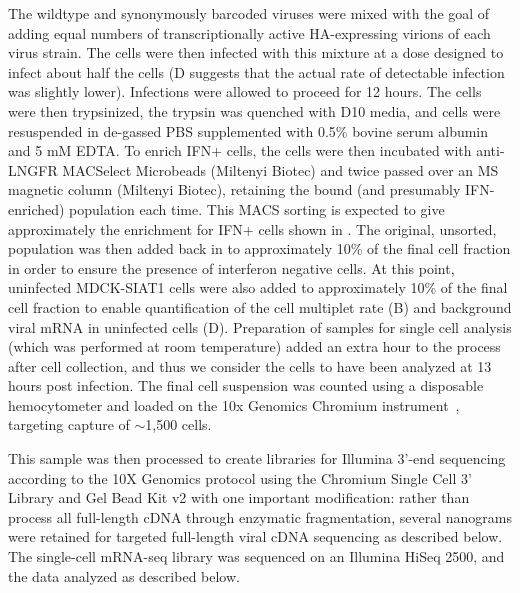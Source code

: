 \documentclass[9pt,lineno]{elife}
\begin{document}
The wildtype and synonymously barcoded viruses were mixed with the goal of adding equal numbers of transcriptionally active HA-expressing virions of each virus strain.
The cells were then infected with this mixture at a dose designed to infect about half the cells (D suggests that the actual rate of detectable infection was slightly lower).
Infections were allowed to proceed for 12 hours.
The cells were then trypsinized, the trypsin was quenched with D10 media, and cells were resuspended in de-gassed PBS supplemented with 0.5\% bovine serum albumin and 5 mM EDTA. 
To enrich IFN+ cells, the cells were then incubated with anti-LNGFR MACSelect Microbeads (Miltenyi Biotec) and twice passed over an MS magnetic column (Miltenyi Biotec), retaining the bound (and presumably IFN-enriched) population each time. 
This MACS sorting is expected to give approximately the enrichment for IFN+ cells shown in .
The original, unsorted, population was then added back in to approximately 10\% of the final cell fraction in order to ensure the presence of interferon negative cells. 
At this point, uninfected MDCK-SIAT1 cells were also added to approximately 10\% of the final cell fraction to enable quantification of the cell multiplet rate (B) and background viral mRNA in uninfected cells (D). 
Preparation of samples for single cell analysis (which was performed at room temperature) added an extra hour to the process after cell collection, and thus we consider the cells to have been analyzed at 13 hours post infection.
The final cell suspension was counted using a disposable hemocytometer and loaded on the 10x Genomics Chromium instrument~\citep{zheng2017massively}, targeting capture of $\sim$1,500 cells. 

This sample was then processed to create libraries for Illumina 3'-end sequencing according to the 10X Genomics protocol using the Chromium Single Cell 3' Library and Gel Bead Kit v2 with one important modification: rather than process all full-length cDNA through enzymatic fragmentation, several nanograms were retained for targeted full-length viral cDNA sequencing as described below.
The single-cell mRNA-seq library was sequenced on an Illumina HiSeq 2500, and the data analyzed as described below.
\end{document}
